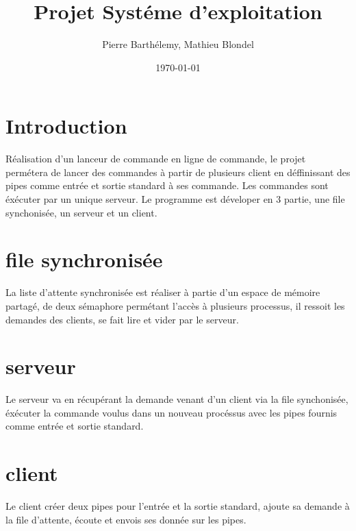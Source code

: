 \documentclass[12pt]{article}
\title{Projet Systéme d'exploitation}
\author{Pierre Barthélemy, Mathieu Blondel}
\date{\today}
\begin{document}
\maketitle
\newpage
\tableofcontents
\newpage
\section{Introduction}
    Réalisation d'un lanceur de commande en ligne de commande, le projet permétera de lancer des commandes à partir de plusieurs client en déffinissant des pipes comme entrée et sortie standard à ses commande. Les commandes sont éxécuter par un unique serveur.
    Le programme est déveloper en 3 partie, une file synchonisée, un serveur et un client.
\section*{file synchronisée}
    La liste d'attente synchronisée est réaliser à partie d'un espace de mémoire partagé, de deux sémaphore permétant l'accès à plusieurs processus, il ressoit les demandes des clients, se fait lire et vider par le serveur.
\section*{serveur}
    Le serveur va en récupérant la demande venant d'un client via la file synchonisée, éxécuter la commande voulus dans un nouveau procéssus avec les pipes fournis comme entrée et sortie standard.
\section*{client}
    Le client créer deux pipes pour l'entrée et la sortie standard, ajoute sa demande à la file d'attente, écoute et envois ses donnée sur les pipes.

\newpage
\end{document}

